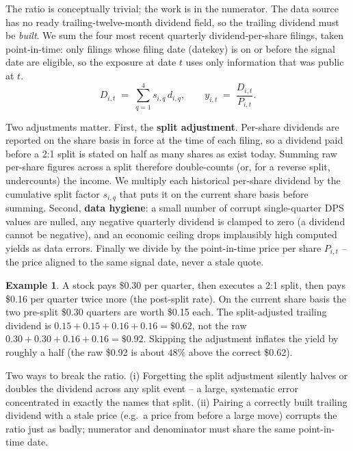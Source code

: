 \documentclass[11pt]{article}
\theoremstyle{definition}
\newtheorem{example}{Example}[section]
\theoremstyle{plain}
\theoremstyle{remark}
\begin{document}
The ratio is conceptually trivial; the work is in the numerator. The data source has no ready trailing-twelve-month dividend field, so the trailing dividend must be \emph{built}. We sum the four most recent quarterly dividend-per-share filings, taken point-in-time: only filings whose filing date (datekey) is on or before the signal date are eligible, so the exposure at date $t$ uses only information that was public at $t$.
\[
D_{i,t} \;=\; \sum_{q=1}^{4} s_{i,q}\, d_{i,q}, \qquad y_{i,t} \;=\; \frac{D_{i,t}}{P_{i,t}}.
\]

Two adjustments matter. First, the \textbf{split adjustment}. Per-share dividends are reported on the share basis in force at the time of each filing, so a dividend paid before a 2:1 split is stated on half as many shares as exist today. Summing raw per-share figures across a split therefore double-counts (or, for a reverse split, undercounts) the income. We multiply each historical per-share dividend by the cumulative split factor $s_{i,q}$ that puts it on the current share basis before summing. Second, \textbf{data hygiene}: a small number of corrupt single-quarter DPS values are nulled, any negative quarterly dividend is clamped to zero (a dividend cannot be negative), and an economic ceiling drops implausibly high computed yields as data errors. Finally we divide by the point-in-time price per share $P_{i,t}$ -- the price aligned to the same signal date, never a stale quote.

\begin{example}
A stock pays \$0.30 per quarter, then executes a 2:1 split, then pays \$0.16 per quarter twice more (the post-split rate). On the current share basis the two pre-split \$0.30 quarters are worth \$0.15 each. The split-adjusted trailing dividend is $0.15+0.15+0.16+0.16=\$0.62$, not the raw $0.30+0.30+0.16+0.16=\$0.92$. Skipping the adjustment inflates the yield by roughly a half (the raw \$0.92 is about $48\%$ above the correct \$0.62).
\end{example}

\begin{pitfall}
Two ways to break the ratio. (i) Forgetting the split adjustment silently halves or doubles the dividend across any split event -- a large, systematic error concentrated in exactly the names that split. (ii) Pairing a correctly built trailing dividend with a stale price (e.g.\ a price from before a large move) corrupts the ratio just as badly; numerator and denominator must share the same point-in-time date.
\end{pitfall}
\end{document}
